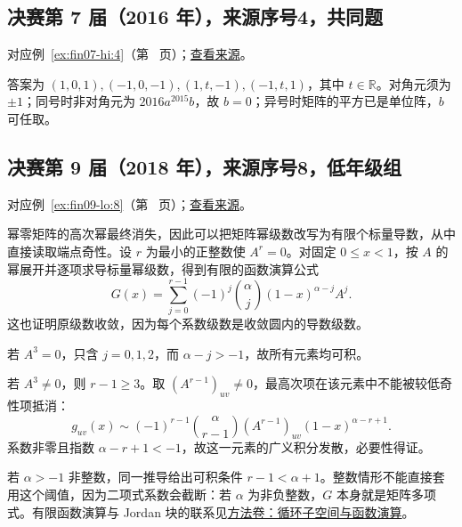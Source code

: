 \documentclass[12pt,fontset=fandol]{ctexart}
\begin{document}
\subsection{决赛第 7 届（2016 年），来源序号4，共同题}\label{ans:fin07-hi:4}\label{pr:fin07-hi:4}

对应例~\ref{ex:fin07-hi:4}（第~\pageref{ex:fin07-hi:4} 页）；\href{https://github.com/lzxcr/cmc-mathematics/blob/64916fa1fdbc3e444a652eca204d5669058ee321/src/problems/finals/07/04.md}{查看来源}。

\begin{solve}

答案为 $(1,0,1),(-1,0,-1),(1,t,-1),(-1,t,1)$，其中 $t\in\mathbb R$。对角元须为 $\pm1$；同号时非对角元为 $2016a^{2015}b$，故 $b=0$；异号时矩阵的平方已是单位阵，$b$ 可任取。

\end{solve}

\subsection{决赛第 9 届（2018 年），来源序号8，低年级组}\label{ans:fin09-lo:8}\label{pr:fin09-lo:8}

对应例~\ref{ex:fin09-lo:8}（第~\pageref{ex:fin09-lo:8} 页）；\href{https://github.com/lzxcr/cmc-mathematics/blob/64916fa1fdbc3e444a652eca204d5669058ee321/src/problems/finals/09/08.md}{查看来源}。

\begin{solve}

幂零矩阵的高次幂最终消失，因此可以把矩阵幂级数改写为有限个标量导数，从中直接读取端点奇性。设 $r$ 为最小的正整数使 $A^r=0$。对固定 $0\leq x<1$，按 $A$ 的幂展开并逐项求导标量幂级数，得到有限的函数演算公式
\[
G(x)=\sum_{j=0}^{r-1}(-1)^j\binom\alpha j(1-x)^{\alpha-j}A^j.
\]
这也证明原级数收敛，因为每个系数级数是收敛圆内的导数级数。

若 $A^3=0$，只含 $j=0,1,2$，而 $\alpha-j>-1$，故所有元素均可积。

若 $A^3\ne0$，则 $r-1\geq3$。取 $(A^{r-1})_{uv}\ne0$，最高次项在该元素中不能被较低奇性项抵消：
\[
g_{uv}(x)\sim(-1)^{r-1}\binom\alpha{r-1}(A^{r-1})_{uv}(1-x)^{\alpha-r+1}.
\]
系数非零且指数 $\alpha-r+1<-1$，故这一元素的广义积分发散，必要性得证。

\end{solve}

\begin{remark}[方法与条件]

若 $\alpha>-1$ 非整数，同一推导给出可积条件 $r-1<\alpha+1$。整数情形不能直接套用这个阈值，因为二项式系数会截断：若 $\alpha$ 为非负整数，$G$ 本身就是矩阵多项式。有限函数演算与 Jordan 块的联系见\hyperref[app:linear-cyclic]{方法卷：循环子空间与函数演算}。

\end{remark}
\end{document}
